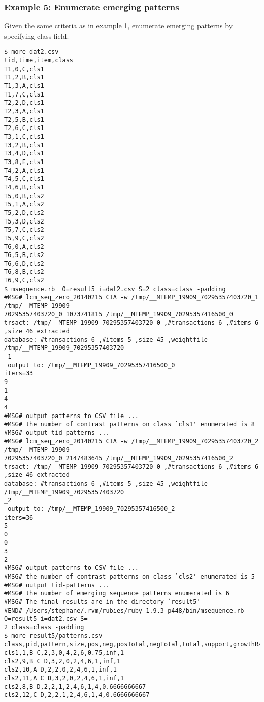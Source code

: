 \subsubsection*{Example 5: Enumerate emerging patterns\label{ex:ep1}}

Given the same criteria as in example 1, enumerate emerging patterns by specifying class field. 


\begin{Verbatim}[baselinestretch=0.7,frame=single]
$ more dat2.csv
tid,time,item,class
T1,0,C,cls1
T1,2,B,cls1
T1,3,A,cls1
T1,7,C,cls1
T2,2,D,cls1
T2,3,A,cls1
T2,5,B,cls1
T2,6,C,cls1
T3,1,C,cls1
T3,2,B,cls1
T3,4,D,cls1
T3,8,E,cls1
T4,2,A,cls1
T4,5,C,cls1
T4,6,B,cls1
T5,0,B,cls2
T5,1,A,cls2
T5,2,D,cls2
T5,3,D,cls2
T5,7,C,cls2
T5,9,C,cls2
T6,0,A,cls2
T6,5,B,cls2
T6,6,D,cls2
T6,8,B,cls2
T6,9,C,cls2
$ msequence.rb  O=result5 i=dat2.csv S=2 class=class -padding
#MSG# lcm_seq_zero_20140215 CIA -w /tmp/__MTEMP_19909_70295357403720_1 /tmp/__MTEMP_19909_
70295357403720_0 1073741815 /tmp/__MTEMP_19909_70295357416500_0
trsact: /tmp/__MTEMP_19909_70295357403720_0 ,#transactions 6 ,#items 6 ,size 46 extracted 
database: #transactions 6 ,#items 5 ,size 45 ,weightfile /tmp/__MTEMP_19909_70295357403720
_1
 output to: /tmp/__MTEMP_19909_70295357416500_0
iters=33
9
1
4
4
#MSG# output patterns to CSV file ...
#MSG# the number of contrast patterns on class `cls1' enumerated is 8
#MSG# output tid-patterns ...
#MSG# lcm_seq_zero_20140215 CIA -w /tmp/__MTEMP_19909_70295357403720_2 /tmp/__MTEMP_19909_
70295357403720_0 2147483645 /tmp/__MTEMP_19909_70295357416500_2
trsact: /tmp/__MTEMP_19909_70295357403720_0 ,#transactions 6 ,#items 6 ,size 46 extracted 
database: #transactions 6 ,#items 5 ,size 45 ,weightfile /tmp/__MTEMP_19909_70295357403720
_2
 output to: /tmp/__MTEMP_19909_70295357416500_2
iters=36
5
0
0
3
2
#MSG# output patterns to CSV file ...
#MSG# the number of contrast patterns on class `cls2' enumerated is 5
#MSG# output tid-patterns ...
#MSG# the number of emerging sequence patterns enumerated is 6
#MSG# The final results are in the directory `result5'
#END# /Users/stephane/.rvm/rubies/ruby-1.9.3-p448/bin/msequence.rb O=result5 i=dat2.csv S=
2 class=class -padding
$ more result5/patterns.csv
class,pid,pattern,size,pos,neg,posTotal,negTotal,total,support,growthRate,postProb
cls1,1,B C,2,3,0,4,2,6,0.75,inf,1
cls2,9,B C D,3,2,0,2,4,6,1,inf,1
cls2,10,A D,2,2,0,2,4,6,1,inf,1
cls2,11,A C D,3,2,0,2,4,6,1,inf,1
cls2,8,B D,2,2,1,2,4,6,1,4,0.6666666667
cls2,12,C D,2,2,1,2,4,6,1,4,0.6666666667
\end{Verbatim}
